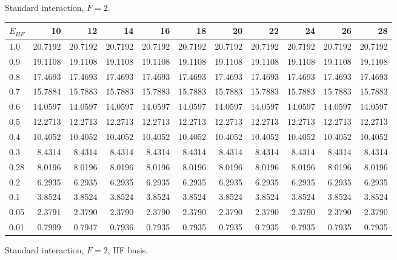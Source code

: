 \begin{landscape}
\begin{table}
\begin{center}
Standard interaction, $F=2$.\\
\begin{tabular}{l|rrrrrrrrrr}
\hline 
$E_{HF}$ & 10 & 12 & 14 & 16 & 18 & 20 & 22 & 24 & 26 & 28 \\
\hline \hline
1.0 & 20.7192 & 20.7192 & 20.7192 & 20.7192 & 20.7192 & 20.7192 & 20.7192 & 20.7192 & 20.7192 & 20.7192 \\ 
0.9 & 19.1108 & 19.1108 & 19.1108 & 19.1108 & 19.1108 & 19.1108 & 19.1108 & 19.1108 & 19.1108 & 19.1108 \\ 
0.8 & 17.4693 & 17.4693 & 17.4693 & 17.4693 & 17.4693 & 17.4693 & 17.4693 & 17.4693 & 17.4693 & 17.4693 \\ 
0.7 & 15.7884 & 15.7883 & 15.7883 & 15.7883 & 15.7883 & 15.7883 & 15.7883 & 15.7883 & 15.7883 & 15.7883 \\ 
0.6 & 14.0597 & 14.0597 & 14.0597 & 14.0597 & 14.0597 & 14.0597 & 14.0597 & 14.0597 & 14.0597 & 14.0597 \\ 
0.5 & 12.2713 & 12.2713 & 12.2713 & 12.2713 & 12.2713 & 12.2713 & 12.2713 & 12.2713 & 12.2713 & 12.2713 \\ 
0.4 & 10.4052 & 10.4052 & 10.4052 & 10.4052 & 10.4052 & 10.4052 & 10.4052 & 10.4052 & 10.4052 & 10.4052 \\ 
0.3 & 8.4314 & 8.4314 & 8.4314 & 8.4314 & 8.4314 & 8.4314       &  8.4314 &  8.4314 &  8.4314 &  8.4314 \\ 
0.28 & 8.0196 & 8.0196 & 8.0196 & 8.0196 & 8.0196 & 8.0196      &  8.0196 &  8.0196 &  8.0196 &  8.0196 \\ 
0.2 & 6.2935 & 6.2935 & 6.2935 & 6.2935 & 6.2935 & 6.2935       &  6.2935 &  6.2935 &  6.2935 &  6.2935 \\ 
0.1 & 3.8524 & 3.8524 & 3.8524 & 3.8524 & 3.8524 & 3.8524       &  3.8524 &  3.8524 &  3.8524 &  3.8524 \\ 
0.05 & 2.3791 & 2.3790 & 2.3790 & 2.3790 & 2.3790 & 2.3790      &  2.3790 &  2.3790 &  2.3790 &  2.3790 \\ 
0.01 & 0.7999 & 0.7947 & 0.7936 & 0.7935 & 0.7935 & 0.7935      &  0.7935 &  0.7935 &  0.7935 &  0.7935 \\ 
\hline \hline
\end{tabular}
\end{center}
\begin{center}
Standard interaction, $F=2$, HF basis.\\

\end{center}
\end{table}
\end{landscape}
